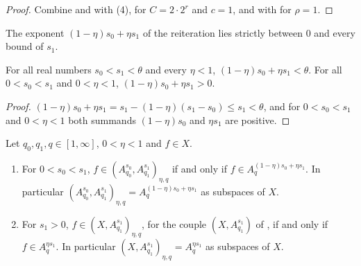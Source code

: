 \begin{proof}
\leanok
Combine  and
 with  (4), for
$C = 2 \cdot 2^r$ and $c = 1$, and with  for $\rho = 1$.
\end{proof}

The exponent $(1 - \eta) s_0 + \eta s_1$ of the reiteration lies strictly between $0$ and every
bound of $s_1$.

\begin{lemma}
\label{lem:reiteration-exponent}
\leanok
For all real numbers $s_0 < s_1 < \theta$ and every $\eta < 1$,
$(1 - \eta) s_0 + \eta s_1 < \theta$. For all $0 < s_0 < s_1$ and $0 < \eta < 1$,
$(1 - \eta) s_0 + \eta s_1 > 0$.
\end{lemma}

\begin{proof}
\leanok
$(1 - \eta) s_0 + \eta s_1 = s_1 - (1 - \eta)(s_1 - s_0) \leq s_1 < \theta$, and for
$0 < s_0 < s_1$ and $0 < \eta < 1$ both summands $(1 - \eta) s_0$ and $\eta s_1$ are positive.
\end{proof}

\begin{theorem}
\label{thm:approximation-spaces-reiteration}
\leanok
{}
Let $q_0, q_1, q \in [1, \infty]$, $0 < \eta < 1$ and $f \in X$.
\begin{enumerate}
  \item For $0 < s_0 < s_1$, $f \in (A^{s_0}_{q_0}, A^{s_1}_{q_1})_{\eta, q}$ if and only if
    $f \in A^{(1-\eta)s_0 + \eta s_1}_q$. In particular
    $(A^{s_0}_{q_0}, A^{s_1}_{q_1})_{\eta, q} = A^{(1-\eta)s_0 + \eta s_1}_q$ as subspaces of
    $X$.
  \item For $s_1 > 0$, $f \in (X, A^{s_1}_{q_1})_{\eta, q}$, for the couple
    $(X, A^{s_1}_{q_1})$ of , if and only if
    $f \in A^{\eta s_1}_q$. In particular $(X, A^{s_1}_{q_1})_{\eta, q} = A^{\eta s_1}_q$ as
    subspaces of $X$.
\end{enumerate}
\end{theorem}

